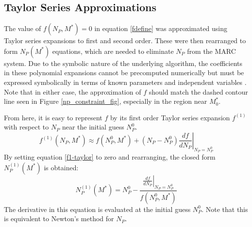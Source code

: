 \documentclass{ansconf}
\begin{document}
\subsection{Taylor Series Approximations}
\label{sec:aproxmeth}

The value of $f(N_P,M^*)=0$ in equation \ref{fdefine} was approximated using 
Taylor series expansions to first and second order.  These were then rearranged to 
form $N_P(M^*)$ equations, which are needed to eliminate $N_P$ from the MARC system.  
Due to the symbolic nature of the underlying algorithm, the coefficients in these
polynomial expansions cannot be precomputed numerically but must be 
expressed symbolically in terms of known parameters and independent variables 
\cite{Sacks:1989:ASS:1623755.1623823}.
Note that in 
either case, the approximation of $f$ should match the dashed contour line seen in 
Figure \ref{np_constraint_fig}, especially in the region near $M_0^*$.

From here, it is easy to represent $f$ by its first order Taylor series expansion
$f^{(1)}$ with respect to $N_P$ near the initial guess $N_P^0$.
\begin{equation}
f^{(1)}(N_P,M^*) \approx f(N_P^0,M^*) + 
    \left(N_P -N_P^0\right)\left.\frac{df}{dN_P}\right|_{N_P=N_P^0}
\label{f1-taylor}
\end{equation}
By setting equation \ref{f1-taylor} to zero and rearranging, the
closed form $N_P^{(1)}(M^*)$ is obtained:
\begin{equation}
N_P^{(1)}(M^*) = N_P^0 - \frac{\left.\frac{df}{dN_P}\right|_{N_P=N_P^0}}{f(N_P^0,M^*)}
\label{np_closed1}
\end{equation}
The derivative in this equation is evaluated at the initial guess $N_P^0$.
Note that this is equivalent to Newton's method for $N_P$.
\end{document}
